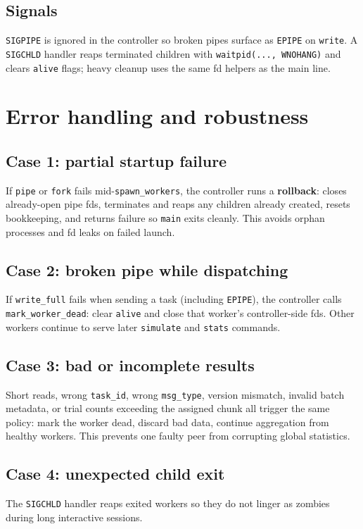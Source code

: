 \documentclass[11pt]{article}
\begin{document}
\subsection{Signals}
\texttt{SIGPIPE} is ignored in the controller so broken pipes surface as \texttt{EPIPE} on \texttt{write}. A \texttt{SIGCHLD} handler reaps terminated children with \texttt{waitpid(..., WNOHANG)} and clears \texttt{alive} flags; heavy cleanup uses the same fd helpers as the main line.

\section{Error handling and robustness}
\label{sec:errors}

\subsection{Case 1: partial startup failure}
If \texttt{pipe} or \texttt{fork} fails mid-\texttt{spawn\_workers}, the controller runs a \textbf{rollback}: closes already-open pipe fds, terminates and reaps any children already created, resets bookkeeping, and returns failure so \texttt{main} exits cleanly. This avoids orphan processes and fd leaks on failed launch.

\subsection{Case 2: broken pipe while dispatching}
If \texttt{write\_full} fails when sending a task (including \texttt{EPIPE}), the controller calls \texttt{mark\_worker\_dead}: clear \texttt{alive} and close that worker's controller-side fds. Other workers continue to serve later \texttt{simulate} and \texttt{stats} commands.

\subsection{Case 3: bad or incomplete results}
Short reads, wrong \texttt{task\_id}, wrong \texttt{msg\_type}, version mismatch, invalid batch metadata, or trial counts exceeding the assigned chunk all trigger the same policy: mark the worker dead, discard bad data, continue aggregation from healthy workers. This prevents one faulty peer from corrupting global statistics.

\subsection{Case 4: unexpected child exit}
The \texttt{SIGCHLD} handler reaps exited workers so they do not linger as zombies during long interactive sessions.
\end{document}
